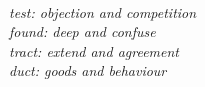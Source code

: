 \leavevmode \\
\begin{center}
    \begin{minipage}{0.6\textwidth}
        \textit{%
            test: objection and competition \\
            found: deep and confuse \\
            tract: extend and agreement \\
            duct: goods and behaviour}%
    \end{minipage}
\end{center}
